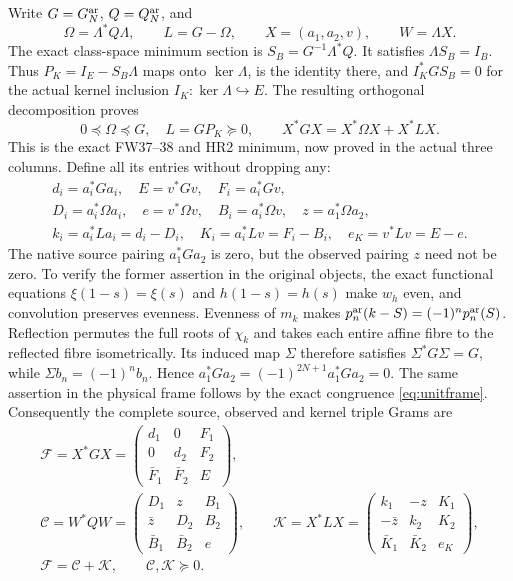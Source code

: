 \documentclass[11pt]{article}
\begin{document}
Write $G=G_N^{\rm ar}$, $Q=Q_N^{\rm ar}$, and
\begin{equation}\label{eq:omegal}
 \Omega=\Lambda^*Q\Lambda,\qquad L=G-\Omega,\qquad
 X=(a_1,a_2,v),\qquad W=\Lambda X.
\end{equation}
The exact class-space minimum section is
$S_B=G^{-1}\Lambda^*Q$.  It satisfies $\Lambda S_B=I_B$.
Thus $P_K=I_E-S_B\Lambda$ maps onto $\ker\Lambda$, is the identity
there, and $I_K^*GS_B=0$ for the actual kernel inclusion
$I_K:\ker\Lambda\hookrightarrow E$.
The resulting orthogonal decomposition proves
\begin{equation}\label{eq:split}
 0\preceq\Omega\preceq G,\quad L=GP_K\succeq0,
 \qquad X^*GX=X^*\Omega X+X^*LX.
\end{equation}
This is the exact FW37--38 and HR2 minimum, now proved in the actual
three columns.  Define all its entries without dropping any:
\begin{equation}\label{eq:entries}
 \begin{gathered}
 d_i=a_i^*Ga_i,\quad E=v^*Gv,\quad F_i=a_i^*Gv,\\
 D_i=a_i^*\Omega a_i,\quad e=v^*\Omega v,\quad
 B_i=a_i^*\Omega v,\quad z=a_1^*\Omega a_2,\\
 k_i=a_i^*La_i=d_i-D_i,\quad
 K_i=a_i^*Lv=F_i-B_i,\quad e_K=v^*Lv=E-e.
 \end{gathered}
\end{equation}
The native source pairing $a_1^*Ga_2$ is zero, but the observed pairing
$z$ need not be zero.  To verify the former assertion in the original
objects, the exact functional equations $\xi(1-s)=\xi(s)$ and
$h(1-s)=h(s)$ make $w_h$ even, and convolution preserves evenness.
Evenness of $m_k$ makes $p_n^{\rm ar}(k-S)=(-1)^np_n^{\rm ar}(S)$.
Reflection permutes the full roots of $\chi_k$ and takes each entire
affine fibre to the reflected fibre isometrically.  Its induced map
$\Sigma$ therefore satisfies $\Sigma^*G\Sigma=G$, while
$\Sigma b_n=(-1)^nb_n$.  Hence
$a_1^*Ga_2=(-1)^{2N+1}a_1^*Ga_2=0$.  The same assertion in the
physical frame follows by the exact congruence \eqref{eq:unitframe}.
Consequently the complete source, observed and kernel triple Grams are
\begin{equation}\label{eq:threegrams}
 \begin{gathered}
 \mathcal F=X^*GX=
 \begin{pmatrix}d_1&0&F_1\\0&d_2&F_2\\\bar F_1&\bar F_2&E\end{pmatrix},\\
 \mathcal C=W^*QW=
 \begin{pmatrix}D_1&z&B_1\\\bar z&D_2&B_2\\\bar B_1&\bar B_2&e\end{pmatrix},\qquad
 \mathcal K=X^*LX=
 \begin{pmatrix}k_1&-z&K_1\\-\bar z&k_2&K_2\\\bar K_1&\bar K_2&e_K\end{pmatrix},\\
 \mathcal F=\mathcal C+\mathcal K,\qquad \mathcal C,\mathcal K\succeq0.
 \end{gathered}
\end{equation}
\end{document}
